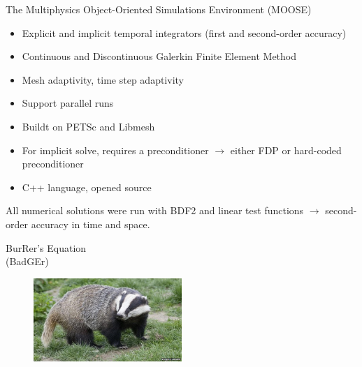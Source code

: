 \documentclass[xcolor=dvipsnames,10pt]{beamer}
\begin{document}
\begin{frame}{The Multiphysics Object-Oriented Simulations Environment (MOOSE)}
\begin{block}{}
\begin{itemize}
\setlength{\itemsep}{10pt}
\item Explicit and implicit temporal integrators (first and second-order accuracy)
\item Continuous and Discontinuous Galerkin Finite Element Method
\item Mesh adaptivity, time step adaptivity
\item Support parallel runs
\item Buildt on PETSc and Libmesh
\item For implicit solve, requires a preconditioner $\to$ either FDP or hard-coded preconditioner
\item C++ language, opened source
\end{itemize}
\end{block}
\begin{block}{}
All numerical solutions were run with BDF2 and linear test functions $\to$ second-order accuracy in time and space.
\end{block}
\end{frame}
\begin{frame}
\begin{center}
BurRer's Equation \\
(BadGEr)
\end{center}
\begin{figure}[H]
\centering
\includegraphics[width=0.5\textwidth]{../figures/badger.png}
\end{figure}
\end{frame}
\end{document}
